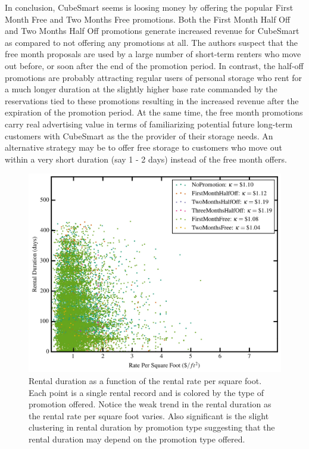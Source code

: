 \documentclass[times]{aastex6}
\begin{document}
In conclusion, CubeSmart seems is loosing money by offering the popular First Month Free and Two Months Free promotions. Both the First Month Half Off and Two Months Half Off promotions generate increased revenue for CubeSmart as compared to not offering any promotions at all. The authors suspect that the free month proposals are used by a large number of short-term renters who move out before, or soon after the end of the promotion period. In contrast, the half-off promotions are probably attracting regular users of personal storage who rent for a much longer duration at the slightly higher base rate commanded by the reservations tied to these promotions resulting in the increased revenue after the expiration of the promotion period. At the same time, the free month promotions carry real advertising value in terms of familiarizing potential future long-term customers with CubeSmart as the the provider of their storage needs. An alternative strategy may be to offer free storage to customers who move out within a very short duration (say 1 - 2 days) instead of the free month offers.

\begin{figure}
	\includegraphics[width=0.9\columnwidth]{plots/FootRateVSDurations.jpg}
    \caption{Rental duration as a function of the rental rate per square foot. Each point is a single rental record and is colored by the type of promotion offered. Notice the weak trend in the rental duration as the rental rate per square foot varies. Also significant is the slight clustering in rental duration by promotion type suggesting that the rental duration may depend on the promotion type offered.}
    \label{fig:FootRateVSDuration}
\end{figure}
\end{document}
